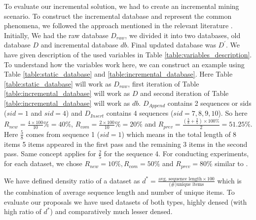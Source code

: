 To evaluate our incremental solution, we had to create an incremental mining scenario. To construct the incremental database and represent the common phenomena, we followed the approach mentioned in the relevant literature \cite{lin2004incremental}. Initially, We had the raw database $D_{raw}$, we divided it into two databases, old database $D$ and incremental database $db$. Final updated database was $D^{\prime}$. We have given description of the used variables in Table \ref{table:variables_description}. To understand how the variables work here, we can construct an example using Table \ref{table:static_database} and \ref{table:incremental_database}. Here Table \ref{table:static_database} will work as $D_{raw}$, first iteration of Table \ref{table:incremental_database} will work as $D$ and second iteration of Table \ref{table:incremental_database} will work as $db$. $D_{Append}$ contains 2 sequences or sids ($sid=1$ and $sid=4$) and $D_{Insert}$ contains 4 sequences ($sid=7,8,9,10$). So here $R_{new}=\frac{4\times100}{10}\%=40\%$, $R_{com}=\frac{2 \times 100}{10}\%=20\%$ and $R_{prev}=\frac{(\frac{5}{8}+\frac{2}{5})\times 100\%}{2}=51.25\%$. Here $\frac{5}{8}$ comes from sequence 1 ($sid=1$) which means in the total length of 8 items 5 items appeared in the first pass and the remaining 3 items in the second pass. Same concept applies for $\frac{2}{5}$ for the sequence 4. For conducting experiments, for each dataset, we chose $R_{new}=10\%, R_{com}=50\%$ and $R_{prev}=80\%$ similar to \cite{lin2004incremental}.



We have defined density ratio of a dataset as $d^{*} = \frac{\text{avg. sequence length} \times 100}{\text{(\#)unique items}}$ which is the combination of average sequence length and number of unique items. To evaluate our proposals we have used datasets of both types, highly densed (with high ratio of $d^{*}$) and comparatively much lesser densed.



